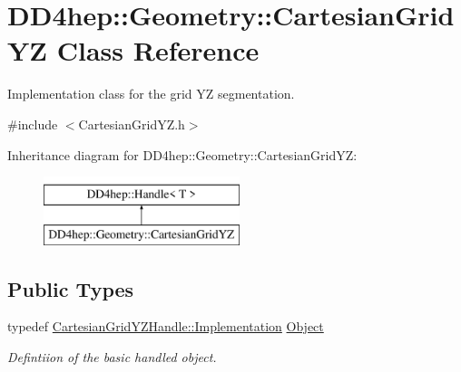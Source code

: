 \hypertarget{class_d_d4hep_1_1_geometry_1_1_cartesian_grid_y_z}{}\section{D\+D4hep\+:\+:Geometry\+:\+:Cartesian\+Grid\+YZ Class Reference}
\label{class_d_d4hep_1_1_geometry_1_1_cartesian_grid_y_z}


Implementation class for the grid YZ segmentation.  




{\ttfamily \#include $<$Cartesian\+Grid\+Y\+Z.\+h$>$}

Inheritance diagram for D\+D4hep\+:\+:Geometry\+:\+:Cartesian\+Grid\+YZ\+:\begin{figure}[H]
\begin{center}
\leavevmode
\includegraphics[height=2.000000cm]{class_d_d4hep_1_1_geometry_1_1_cartesian_grid_y_z}
\end{center}
\end{figure}
\subsection*{Public Types}
\begin{DoxyCompactItemize}
\item 
typedef \hyperlink{class_d_d4hep_1_1_handle_ad7ff728a25806079516b8965b9113f1a}{Cartesian\+Grid\+Y\+Z\+Handle\+::\+Implementation} \hyperlink{class_d_d4hep_1_1_geometry_1_1_cartesian_grid_y_z_ad5db30e8623d30e9f23f0c4f8e0b546e}{Object}
\begin{DoxyCompactList}\small\item\em Defintiion of the basic handled object. \end{DoxyCompactList}\end{DoxyCompactItemize}
